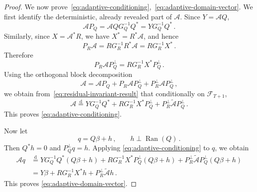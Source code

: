 \documentclass[10pt,a4paper]{amsart}
\newcommand{\cA}{\mathcal A}
\begin{document}
\begin{proof}
We now prove~\eqref{eq:adaptive-conditioning},~\eqref{eq:adaptive-domain-vector}. We first identify the deterministic, already revealed part of $\cA$. Since $Y=\mathcal A Q$,
\[
  \mathcal A P_Q
  =
  \mathcal A QG_Q^{-1}Q^*
  =
  YG_Q^{-1}Q^*\,.
\]
Similarly, since $X=\mathcal A^*R$, we have $X^*=R^*\mathcal A$, and hence
\[
  P_R\mathcal A
  =
  RG_R^{-1}R^*\mathcal A
  =
  RG_R^{-1}X^*\,.
\]
Therefore
\[
  P_R\mathcal A P_Q^\perp
  =
  RG_R^{-1}X^*P_Q^\perp\,.
\]
Using the orthogonal block decomposition
\[
  \mathcal A
  =
  \mathcal A P_Q
  +
  P_R\mathcal A P_Q^\perp
  +
  P_R^\perp\mathcal A P_Q^\perp\,,
\]
we obtain from~\eqref{eq:residual-invariant-result} that conditionally on $\mathscr F_{T+1}$,
\[
  \mathcal A
  \stackrel{\mathrm d}{=}
  YG_Q^{-1}Q^*
  +
  RG_R^{-1}X^*P_Q^\perp
  +
  P_R^\perp\widetilde{\mathcal A}P_Q^\perp\,.
\]
This proves \eqref{eq:adaptive-conditioning}.

Now let
\[
  q=Q\beta+h\,,
  \qquad
  h\perp\operatorname{Ran}(Q)\,.
\]
Then $Q^*h=0$ and $P_Q^\perp q=h$. Applying \eqref{eq:adaptive-conditioning} to $q$, we obtain
\[
\begin{aligned}
  \mathcal A q
  &\stackrel{\mathrm d}{=}
  YG_Q^{-1}Q^*(Q\beta+h)
  +
  RG_R^{-1}X^*P_Q^\perp(Q\beta+h)
  +
  P_R^\perp\widetilde{\mathcal A}P_Q^\perp(Q\beta+h) \\
  &=
  Y\beta
  +
  RG_R^{-1}X^*h
  +
  P_R^\perp\widetilde{\mathcal A}h\,.
\end{aligned}
\]
This proves \eqref{eq:adaptive-domain-vector}.


\end{proof}
\end{document}
